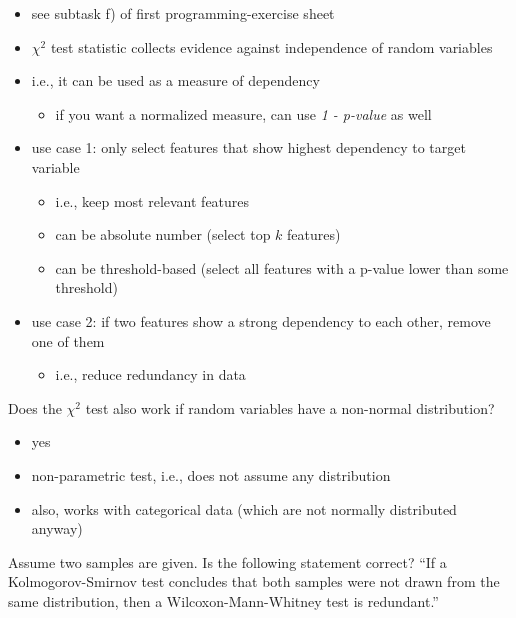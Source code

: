 \documentclass[12pt]{article}
\begin{document}
\begin{itemize}[left=0pt, nosep]
	\item see subtask f) of first programming-exercise sheet
	\item $\chi^2$ test statistic collects evidence against independence of random variables
	\item i.e., it can be used as a measure of dependency
	\begin{itemize}[left=0pt, nosep]
		\item if you want a normalized measure, can use \emph{1 - p-value} as well
	\end{itemize}
	\item use case 1: only select features that show highest dependency to target variable
	\begin{itemize}[left=0pt, nosep]
		\item i.e., keep most relevant features
		\item can be absolute number (select top $k$ features)
		\item can be threshold-based (select all features with a p-value lower than some threshold)
	\end{itemize}
	\item use case 2: if two features show a strong dependency to each other, remove one of them
	\begin{itemize}[left=0pt, nosep]
		\item i.e., reduce redundancy in data
	\end{itemize}
\end{itemize}

\begin{question}
	Does the $\chi^2$ test also work if random variables have a non-normal distribution?
\end{question}

\begin{itemize}[left=0pt, nosep]
	\item yes
	\item non-parametric test, i.e., does not assume any distribution
	\item also, works with categorical data (which are not normally distributed anyway)
\end{itemize}

\begin{question}
	Assume two samples are given.
	Is the following statement correct?
	``If a Kolmogorov-Smirnov test concludes that both samples were not drawn from the same distribution, then a Wilcoxon-Mann-Whitney test is redundant.''
\end{question}
\end{document}

